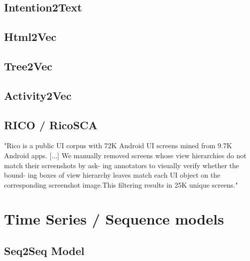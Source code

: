 \subsection{Intention2Text}

\subsection{Html2Vec}

\subsection{Tree2Vec}

\subsection{Activity2Vec}


\subsection{RICO / RicoSCA}

"Rico is a public UI corpus with 72K Android UI
screens mined from 9.7K Android apps. [...]
We manually removed screens whose view
hierarchies do not match their screenshots by ask-
ing annotators to visually verify whether the bound-
ing boxes of view hierarchy leaves match each UI
object on the corresponding screenshot image.This filtering results in 25K unique screens."

\section{Time Series / Sequence models}
\subsection{Seq2Seq Model}


